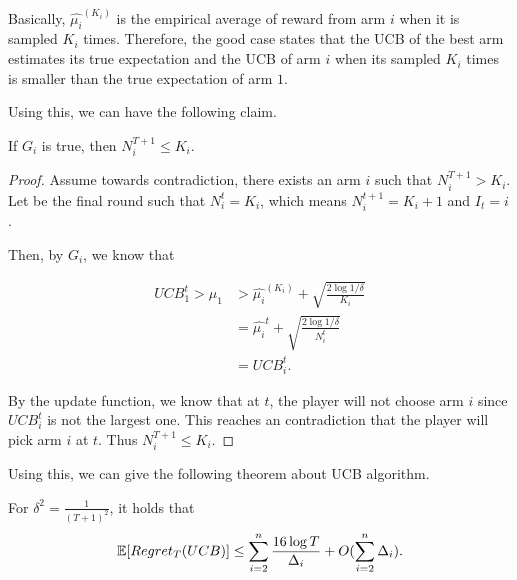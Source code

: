 \documentclass[../main.tex]{subfiles}
\begin{document}
	Basically, $\hat{\mu_i}^{(K_i)}$ is the empirical average of reward from arm $i$ when it is sampled $K_i$ times. Therefore, the good case states that the UCB of the best arm estimates its true expectation and the UCB of arm $i$ when its sampled $K_i$ times is smaller than the true expectation of arm $1$.
	
	
	Using this, we can have the following claim.
	
	\begin{claim}
		If $G_i$ is true, then $N_i^{T+1} \leq K_i$.
	\end{claim}

	\begin{proof}
		Assume towards contradiction, there exists an arm $i$ such that $N_i^{T+1} > K_i$. Let be the final round such that $N_i^t = K_i$, which means $N_i^{t+1} = K_i +1$ and $I_t = i$.
		
		Then, by $G_i$, we know that
		
		\begin{equation*}
			\begin{aligned}
				UCB_1^t > \mu_1 & > \hat{\mu_i}^{(K_i)} + \sqrt{\frac{2\log 1/ \delta}{K_i}} \\
								& =  \hat{\mu_i}^{t} +  \sqrt{\frac{2\log 1/ \delta}{N_i^t}} \\
								& = UCB_i^t.
			\end{aligned}
		\end{equation*}
		
		By the update function, we know that at $t$, the player will not choose arm $i$ since $UCB_i^t$ is not the largest one. This reaches an contradiction that the player will pick arm $i$ at $t$. Thus $N_i^{T+1} \leq K_i$.
	\end{proof}

	Using this, we can give the following theorem about UCB algorithm.
	
	\begin{theorem}
		For $\delta^2 = \frac{1}{(T+1)^2}$, it holds that 
			\begin{equation}
				\mathbb{E}[Regret_T(UCB)] \leq \sum\limits_{i=2}^n \frac{16 \log T}{\Delta_i} + O(\sum\limits_{i=2}^n \Delta_i).
			\end{equation}
	\end{theorem}
\end{document}
